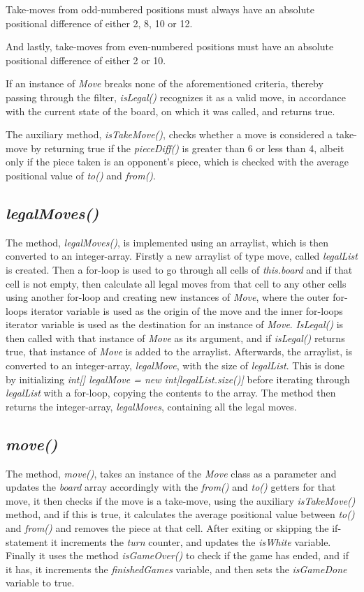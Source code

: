 \documentclass[12pt, a4paper]{article}
\begin{document}
Take-moves from odd-numbered positions must always have an absolute positional difference of either 2, 8, 10 or 12. \par
And lastly, take-moves from even-numbered positions must have an absolute positional difference of either 2 or 10. \par
If an instance of \emph{Move} breaks none of the aforementioned criteria, thereby passing through the filter, \emph{isLegal()} recognizes it as a valid move, in accordance with the current state of the board, on which it was called, and returns true. \par
The auxiliary method, \emph{isTakeMove()}, checks whether a move is considered a take-move by returning true if the \emph{pieceDiff()} is greater than 6 or less than 4, albeit only if the piece taken is an opponent's piece, which is checked with the average positional value of \emph{to()} and \emph{from()}.

\subsection{\emph{legalMoves()}}
The method, \emph{legalMoves()}, is implemented using an arraylist, which is then converted to an integer-array. Firstly a new arraylist of type move, called \emph{legalList} is created. Then a for-loop is used to go through all cells of \emph{this.board} and if that cell is not empty, then calculate all legal moves from that cell to any other cells using another for-loop and creating new instances of \emph{Move}, where the outer for-loops iterator variable is used as the origin of the move and the inner for-loops iterator variable is used as the destination for an instance of \emph{Move}. \emph{IsLegal()} is then called with that instance of \emph{Move} as its argument, and if \emph {isLegal()} returns true, that instance of \emph{Move} is added to the arraylist. Afterwards, the arraylist, is converted to an integer-array, \emph{legalMove}, with the size of \emph{legalList}. This is done by initializing \emph{int[] legalMove = new int[legalList.size()]} before iterating through \emph{legalList} with a for-loop, copying the contents to the array. The method then returns the integer-array, \emph{legalMoves}, containing all the legal moves.

\subsection{\emph{move()}}
The method, \emph{move()}, takes an instance of the \emph{Move} class as a parameter and updates the \emph{board} array accordingly with the \emph{from()} and \emph{to()} getters for that move, it then checks if the move is a take-move, using the auxiliary \emph{isTakeMove()} method, and if this is true, it calculates the average positional value between \emph{to()} and \emph{from()} and removes the piece at that cell.
After exiting or skipping the if-statement it increments the \emph{turn} counter, and updates the \emph{isWhite} variable. Finally it uses the method \emph{isGameOver()} to check if the game has ended, and if it has, it increments the \emph{finishedGames} variable, and then sets the \emph{isGameDone} variable to true.
\end{document}

